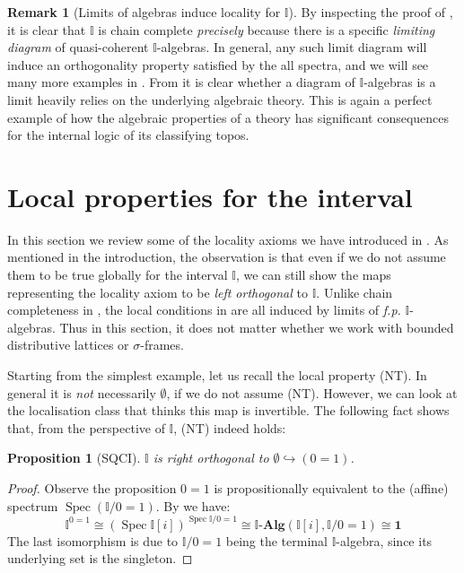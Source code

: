 \documentclass[a4paper,12pt]{amsart}
\newtheorem{proposition}[theorem]{Proposition}
\theoremstyle{definition}
\newtheorem{remark}[theorem]{Remark}
\newcommand{\mb}[1]{\mathbf{#1}}
\newcommand{\mbb}[1]{\mathbb{#1}}
\newcommand{\I}{\mbb I}
\newcommand{\alg}{\text{-}\mb{Alg}}
\newcommand{\hook}{\hookrightarrow}
\newcommand{\emp}{\emptyset}
\newcommand{\spec}{\operatorname{Spec}}
\begin{document}
\begin{remark}[Limits of algebras induce locality for $\I$]\label{rem:limofalgloc}
  By inspecting the proof of , it is clear that $\I$ is chain complete \emph{precisely} because there is a specific \emph{limiting diagram} of quasi-coherent $\I$-algebras. In general, any such limit diagram will induce an orthogonality property satisfied by the all spectra, and we will see many more examples in . From  it is clear whether a diagram of $\I$-algebras is a limit heavily relies on the underlying algebraic theory. This is again a perfect example of how the algebraic properties of a theory has significant consequences for the internal logic of its classifying topos.
\end{remark}

\section{Local properties for the interval}\label{sec:local}

In this section we review some of the locality axioms we have introduced in . As mentioned in the introduction, the observation is that even if we do not assume them to be true globally for the interval $\I$, we can still show the maps representing the locality axiom to be \emph{left orthogonal} to $\I$.  
Unlike chain completeness in , the local conditions in  are all induced by limits of \emph{f.p.} $\I$-algebras. Thus in this section, it does not matter whether we work with bounded distributive lattices or $\sigma$-frames.

Starting from the simplest example, let us recall the local property (NT). In general it is \emph{not} necessarily $\emp$, if we do not assume (NT). However, we can look at the localisation class that thinks this map is invertible. The following fact shows that, from the perspective of $\I$, (NT) indeed holds:

\begin{proposition}[SQCI]\label{specisnontrivial}
  $\I$ is right orthogonal to $\emp \hook (0 = 1)$.
\end{proposition}
\begin{proof}
  Observe the proposition $0 = 1$ is propositionally equivalent to the (affine) spectrum $\spec(\I/0=1)$. By  we have:
  \[ 
    \I^{0=1} \cong 
    (\spec \I[i])^{\spec{\I/0=1}}
    \cong 
    \I\alg(\I[i], \I/0=1) 
    \cong 
    \mathbf{1}
  \]
  The last isomorphism is due to $\I/0=1$ being the terminal $\I$-algebra, since its underlying set is the singleton.
\end{proof}
\end{document}
